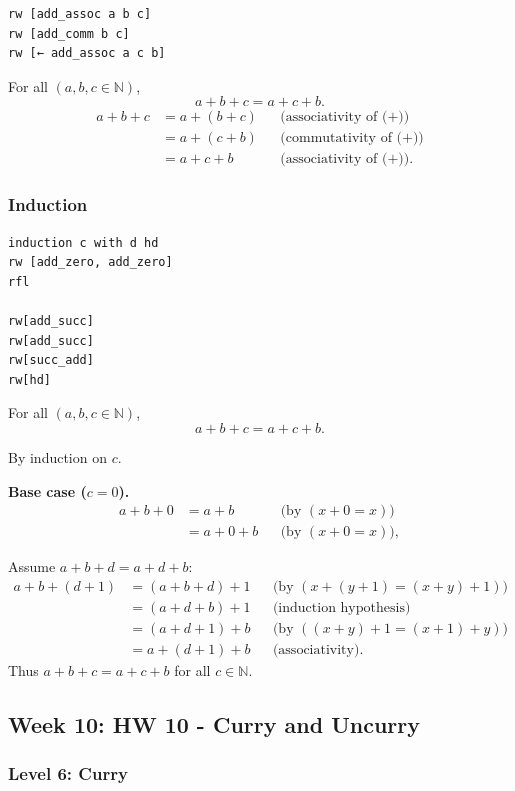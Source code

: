 \documentclass{article}
\theoremstyle{theorem}
\theoremstyle{definition}
\theoremstyle{remark}
\begin{document}
\begin{verbatim}
rw [add_assoc a b c] 
rw [add_comm b c] 
rw [← add_assoc a c b]
\end{verbatim}

For all $(a,b,c\in\mathbb{N})$,
\[
a+b+c = a+c+b .
\]
\[
\begin{aligned}
a+b+c
&= a+(b+c)      && \text{(associativity of (+))} \\
&= a+(c+b)      && \text{(commutativity of (+))} \\
&= a+c+b        && \text{(associativity of (+)).}
\end{aligned}
\]

\subsubsection{Induction}

\begin{verbatim}
induction c with d hd
rw [add_zero, add_zero]
rfl

rw[add_succ]
rw[add_succ]
rw[succ_add]
rw[hd]
\end{verbatim}

For all $(a,b,c\in\mathbb{N})$,
\[
a+b+c = a+c+b .
\]

By induction on $c$.

\textbf{Base case ($c=0$).}
\[
\begin{aligned}
a+b+0 &= a+b && \text{(by $(x+0=x)$)} \\
&= a+0+b && \text{(by $(x+0=x)$)},
\end{aligned}
\]

Assume $a+b+d = a+d+b$:
\[
\begin{aligned}
a+b+(d+1)
&= (a+b+d)+1            && \text{(by $(x+(y+1)=(x+y)+1)$)} \\
&= (a+d+b)+1            && \text{(induction hypothesis)} \\
&= (a+d+1)+b            && \text{(by $((x+y)+1=(x+1)+y)$)} \\
&= a+(d+1)+b            && \text{(associativity).}
\end{aligned}
\]
Thus $a+b+c=a+c+b$ for all $c\in\mathbb{N}$.

\subsection{Week 10: HW 10 - Curry and Uncurry}

\subsubsection{Level 6: Curry}
\end{document}
